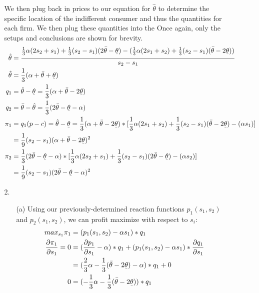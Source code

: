 \documentclass[12pt,letterpaper]{article}
\begin{document}
\begin{enumerate}
\begin{enumerate}
	We then plug back in prices to our equation for $\hat{\theta}$ to determine the specific location of the indifferent consumer and thus the quantities for each firm. We then plug these quantities into the Once again, only the setups and conclusions are shown for brevity.
	\begin{align*}
		\hat{\theta} &= \frac{\frac{1}{3}\alpha(2s_2 + s_1) + \frac{1}{3}(s_2 - s_1)(2\bar{\theta} - \underset{\bar{}}{\theta}) - (\frac{1}{3}\alpha(2s_1 + s_2) + \frac{1}{3}(s_2 -s_1)(\bar{\theta} - 2\underset{\bar{}}{\theta}))}{s_2 - s_1} \\
		\hat{\theta} &= \frac{1}{3} (\alpha + \bar{\theta} + \underset{\bar{}}{\theta}) \\
		q_1 &= \hat{\theta} - \underset{\bar{}}{\theta} = \frac{1}{3} (\alpha + \bar{\theta} - 2\underset{\bar{}}{\theta}) \\
		q_2 &= \bar{\theta} - \hat{\theta} = \frac{1}{3} (2\bar{\theta} - \underset{\bar{}}{\theta} - \alpha) \\
		\pi_1 &= q_1 (p-c) = \hat{\theta} - \underset{\bar{}}{\theta} = \frac{1}{3} (\alpha + \bar{\theta} - 2\underset{\bar{}}{\theta}) * [\frac{1}{3}\alpha(2s_1 + s_2) + \frac{1}{3}(s_2 -s_1)(\bar{\theta} - 2\underset{\bar{}}{\theta}) - (\alpha s_1)] \\ 
		&= \frac{1}{9}(s_2 - s_1)(\alpha + \bar{\theta} - 2\underset{\bar{}}{\theta})^2 \\
		\pi_2 &= \frac{1}{3} (2\bar{\theta} - \underset{\bar{}}{\theta} - \alpha) * [\frac{1}{3}\alpha(2s_2 + s_1) + \frac{1}{3}(s_2 - s_1)(2\bar{\theta} - \underset{\bar{}}{\theta}) - (\alpha s_2)] \\
		&= \frac{1}{9}(s_2 - s_1)(2\bar{\theta} - \underset{\bar{}}{\theta} - \alpha)^2
	\end{align*}


	\item[2.]
	\begin{enumerate}
		\item[(a)] Using our previously-determined reaction functions $p_1(s_1, s_2)$ and $p_2(s_1, s_2)$, we can profit maximize with respect to $s_i$:
		\begin{align*}
			max_{s_1} \pi_1 &= (p_1(s_1, s_2) - \alpha s_1) * q_1 \\
			\frac{\partial \pi_1}{\partial s_1}= 0 &=  (\frac{\partial p_1}{\partial s_1} - \alpha) * q_1 + (p_1(s_1, s_2) - \alpha s_1) * \frac{\partial q_1}{\partial s_1} \\
			&= (\frac{2}{3}\alpha - \frac{1}{3}(\bar{\theta} - 2\underset{\bar{}}{\theta}) - \alpha) * q_1 + 0 \\ 
			0 &= (-\frac{1}{3}\alpha -\frac{1}{3}(\bar{\theta} - 2\underset{\bar{}}{\theta}))*q_1
		\end{align*}
	

\end{enumerate}
\end{enumerate}
\end{enumerate}
\end{document}
